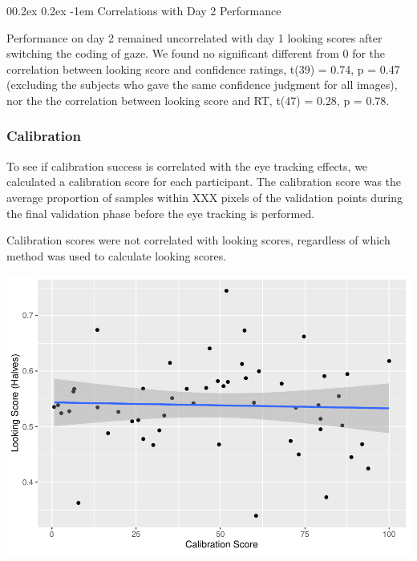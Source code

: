 \documentclass[
  man,floatsintext]{apa6}
\makeatletter
\let\oldparagraph\paragraph
\renewcommand{\paragraph}[1]{\oldparagraph{#1}\mbox{}}
\renewcommand{\paragraph}{\@startsection{paragraph}{4}{\parindent}%
  {0\baselineskip \@plus 0.2ex \@minus 0.2ex}%
  {-1em}%
  {\normalfont\normalsize\bfseries\itshape\typesectitle}}
\makeatother
\begin{document}
\hypertarget{correlations-with-day-2-performance}{%
\paragraph{Correlations with Day 2 Performance}\label{correlations-with-day-2-performance}}

Performance on day 2 remained uncorrelated with day 1 looking scores after switching the coding of gaze. We found no significant different from 0 for the correlation between looking score and confidence ratings, t(39) = 0.74, p = 0.47 (excluding the subjects who gave the same confidence judgment for all images), nor the the correlation between looking score and RT, t(47) = 0.28, p = 0.78.

\hypertarget{calibration-2}{%
\subsubsection{Calibration}\label{calibration-2}}

To see if calibration success is correlated with the eye tracking effects, we calculated a calibration score for each participant. The calibration score was the average proportion of samples within XXX pixels of the validation points during the final validation phase before the eye tracking is performed.

Calibration scores were not correlated with looking scores, regardless of which method was used to calculate looking scores.

\includegraphics{manuscript_files/figure-latex/E3-cal Plot looking score (halves) by calibration-1.pdf}
\end{document}
